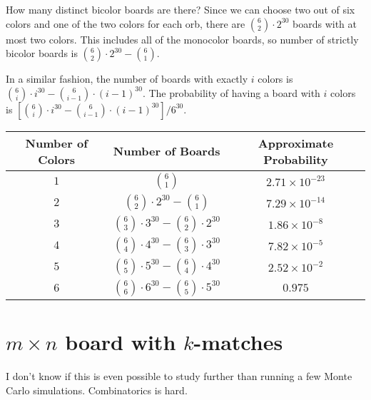 \documentclass[12pt]{article}
\begin{document}
How many distinct bicolor boards are there? Since we can choose two out of six colors and one of the two colors for each orb, there are $\binom{6}{2}\cdot 2^{30}$ boards with at most two colors. This includes all of the monocolor boards, so number of strictly bicolor boards is $\binom{6}{2}\cdot 2^{30}-\binom{6}{1}$.

In a similar fashion, the number of boards with exactly $i$ colors is $\binom{6}{i}\cdot i^{30}-\binom{6}{i-1}\cdot (i-1)^{30}$. The probability of having a board with $i$ colors is $\left[\binom{6}{i}\cdot i^{30}-\binom{6}{i-1}\cdot (i-1)^{30}\right]/6^{30}$.

\begin{center}
\renewcommand{\arraystretch}{2}
    \begin{tabular}{|c|c|c|}
        \hline
        Number of Colors & Number of Boards & Approximate Probability \\
        \hline\hline
        $1$ & $\binom{6}{1}$ & $%
        2.71\times 10^{-23}$ \\
        \hline
        $2$ & $\binom{6}{2}\cdot 2^{30}-\binom{6}{1}$ & $%
        7.29\times 10^{-14}$ \\
        \hline
        $3$ & $\binom{6}{3}\cdot 3^{30}-\binom{6}{2}\cdot 2^{30}$ & $%
        1.86\times 10^{-8}$ \\
        \hline
        $4$ & $\binom{6}{4}\cdot 4^{30}-\binom{6}{3}\cdot 3^{30}$ & $%
        7.82\times 10^{-5}$ \\
        \hline
        $5$ & $\binom{6}{5}\cdot 5^{30}-\binom{6}{4}\cdot 4^{30}$ & $%
        2.52\times 10^{-2}$ \\
        \hline
        $6$ & $\binom{6}{6}\cdot 6^{30}-\binom{6}{5}\cdot 5^{30}$ & $%
        0.975$ \\
        \hline
    \end{tabular}
\renewcommand{\arraystretch}{2}
\end{center}
\section{$m\times n$ board with $k$-matches}
I don't know if this is even possible to study further than running a few Monte Carlo simulations. Combinatorics is hard.
\end{document}
